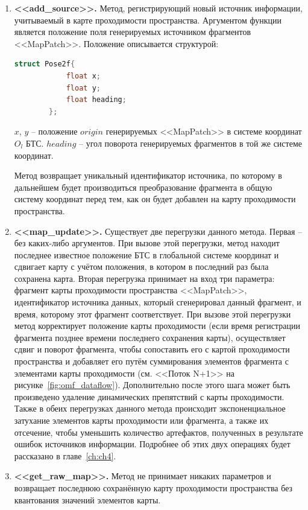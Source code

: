 \begin{enumerate}
	\item \textbf{<<add\_source>>.} Метод, регистрирующий новый источник информации, учитываемый в карте проходимости пространства. Аргументом функции является положение поля генерируемых источником фрагментов <<MapPatch>>. Положение описывается структурой: 
	
	\begin{lstlisting}[language=C++,numbers=none]
		struct Pose2f{
			float x;
			float y;
			float heading;
		};
	\end{lstlisting}
	
	
	$x$, $y$ -- положение $origin$ генерируемых <<MapPatch>> в системе координат $O_l$ БТС. $heading$ -- угол поворота генерируемых фрагментов в той же системе координат.
	
	Метод возвращает уникальный идентификатор источника, по которому в дальнейшем будет производиться преобразование фрагмента в общую систему координат перед тем, как он будет добавлен на карту проходимости пространства.
	
	\item \textbf{<<map\_update>>.} Существует две перегрузки данного метода. Первая -- без каких-либо аргументов. При вызове этой перегрузки, метод находит  последнее известное положение БТС в глобальной системе координат и сдвигает карту с учётом положения, в котором в последний раз была сохранена карта. Вторая перегрузка принимает на вход три параметра: фрагмент карты проходимости пространства <<MapPatch>>, идентификатор источника данных, который сгенерировал данный фрагмент, и время, которому этот фрагмент соответствует. При вызове этой перегрузки метод корректирует положение карты проходимости (если время регистрации фрагмента позднее времени последнего сохранения карты), осуществляет сдвиг и поворот фрагмента, чтобы сопоставить его с картой проходимости пространства и добавляет его путём суммирования элементов фрагмента с элементами карты проходимости (см. <<Поток N+1>> на рисунке~\cref{fig:omf_dataflow}). Дополнительно после этого шага может быть произведено удаление динамических препятствий с карты проходимости. Также в обеих перегрузках данного метода происходит экспоненциальное затухание элементов карты проходимости или фрагмента, а также их отсечение, чтобы уменьшить количество артефактов, полученных в результате ошибок источников информации. Подробнее об этих двух операциях будет рассказано в главе~\cref{ch:ch4}.
	
	\item \textbf{<<get\_raw\_map>>.} Метод не принимает никаких параметров и возвращает последнюю сохранённую карту проходимости пространства без квантования значений элементов карты.
	

\end{enumerate}
